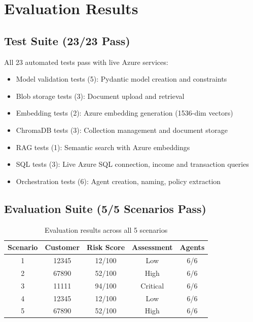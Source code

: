 \documentclass[12pt,a4paper]{article}
\begin{document}
\section{Evaluation Results}

\subsection{Test Suite (23/23 Pass)}

All 23 automated tests pass with live Azure services:
\begin{itemize}
    \item Model validation tests (5): Pydantic model creation and constraints
    \item Blob storage tests (3): Document upload and retrieval
    \item Embedding tests (2): Azure embedding generation (1536-dim vectors)
    \item ChromaDB tests (3): Collection management and document storage
    \item RAG tests (1): Semantic search with Azure embeddings
    \item SQL tests (3): Live Azure SQL connection, income and transaction queries
    \item Orchestration tests (6): Agent creation, naming, policy extraction
\end{itemize}

\subsection{Evaluation Suite (5/5 Scenarios Pass)}

\begin{table}[H]
\centering
\begin{tabular}{ccccc}
\toprule
\textbf{Scenario} & \textbf{Customer} & \textbf{Risk Score} & \textbf{Assessment} & \textbf{Agents} \\
\midrule
1 & 12345 & 12/100 & Low & 6/6 \\
2 & 67890 & 52/100 & High & 6/6 \\
3 & 11111 & 94/100 & Critical & 6/6 \\
4 & 12345 & 12/100 & Low & 6/6 \\
5 & 67890 & 52/100 & High & 6/6 \\
\bottomrule
\end{tabular}
\caption{Evaluation results across all 5 scenarios}
\end{table}
\end{document}
